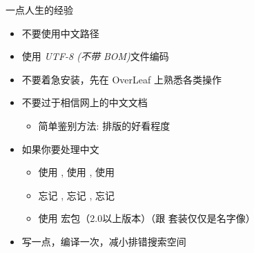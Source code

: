 \begin{frame}{一点人生的经验}
  \begin{itemize}
    \item 不要使用中文路径
    \item 使用 \emph{UTF-8 (不带 BOM)}文件编码
    \item 不要着急安装，先在 OverLeaf 上熟悉各类操作
    \item 不要过于相信网上的中文文档
      \begin{itemize}
        \item 简单鉴别方法: 排版的好看程度
      \end{itemize}
    \item 如果你要处理中文
      \begin{itemize}
        \item 使用 \XeLaTeX, 使用 \XeLaTeX, 使用 \XeLaTeX
        \item 忘记 , 忘记 , 忘记 
        \item 使用  宏包（2.0以上版本）（跟 \CTeX 套装仅仅是名字像）
      \end{itemize}
    \item 写一点，编译一次，减小排错搜索空间
  \end{itemize}
\end{frame}


